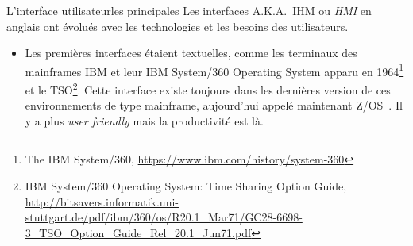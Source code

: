 \documentclass{beamer}
\begin{document}
    \begin{frame}{L'interface utilisateur}{les principales}
        Les interfaces A.K.A.\ IHM ou \textit{HMI} en anglais ont évolués avec les technologies et les besoins des utilisateurs.
        \begin{itemize}
            \item Les premières interfaces étaient textuelles, comme les terminaux des mainframes IBM et leur IBM System/360 Operating System apparu en 1964\footnote{The IBM System/360, \url{https://www.ibm.com/history/system-360}} et le TSO\footnote{IBM System/360 Operating System: Time Sharing Option Guide, \url{http://bitsavers.informatik.uni-stuttgart.de/pdf/ibm/360/os/R20.1_Mar71/GC28-6698-3_TSO_Option_Guide_Rel_20.1_Jun71.pdf}}.
            Cette interface existe toujours dans les dernières version de ces environnements de type mainframe, aujourd'hui appelé maintenant Z/OS~.
            Il y a plus \textit{user friendly} mais la productivité est là.
        \end{itemize}
    \end{frame}
\end{document}
